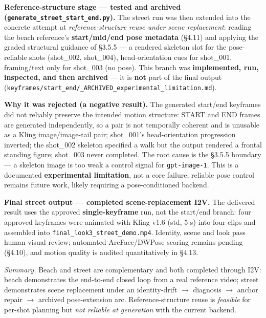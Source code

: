 \documentclass[10pt,twocolumn,letterpaper]{article}
\begin{document}
\textbf{Reference-structure stage --- tested and archived (\texttt{generate\_street\_start\_end.py}).} The street run was then extended into the concrete attempt at \emph{reference-structure reuse under scene replacement}: reading the beach reference's \textbf{start/mid/end pose metadata} (\S{}4.11) and applying the graded structural guidance of \S{}3.5.5 --- a rendered skeleton slot for the pose-reliable shots (shot\_002, shot\_004), head-orientation cues for shot\_001, framing/text only for shot\_003 (no pose). This branch was \textbf{implemented, run, inspected, and then archived} --- it is \textbf{not} part of the final output (\texttt{keyframes/start\_end/\_ARCHIVED\_experimental\_limitation.md}).

\textbf{Why it was rejected (a negative result).} The generated start/end keyframes did not reliably preserve the intended motion structure: START and END frames are generated independently, so a pair is not temporally coherent and is unusable as a Kling image/image-tail pair; shot\_001's head-orientation progression inverted; the shot\_002 skeleton specified a walk but the output rendered a frontal standing figure; shot\_003 never completed. The root cause is the \S{}3.5.5 boundary --- a skeleton image is too weak a control signal for \texttt{gpt-image-1}. This is a documented \textbf{experimental limitation}, not a core failure; reliable pose control remains future work, likely requiring a pose-conditioned backend.

\textbf{Final street output --- completed scene-replacement I2V.} The delivered result uses the approved \textbf{single-keyframe} run, not the start/end branch: four approved keyframes were animated with Kling v1.6 (std, 5 s) into four clips and assembled into \texttt{final\_look3\_street\_demo.mp4}. Identity, scene and look pass human visual review; automated ArcFace/DWPose scoring remains pending (\S{}4.10), and motion quality is audited quantitatively in \S{}4.13.

\emph{Summary.} Beach and street are complementary and both completed through I2V: beach demonstrates the end-to-end closed loop from a real reference video; street demonstrates scene replacement under an identity-drift $\rightarrow$ diagnosis $\rightarrow$ anchor repair $\rightarrow$ archived pose-extension arc. Reference-structure reuse is \emph{feasible} for per-shot planning but \emph{not reliable at generation} with the current backend.

\end{document}
